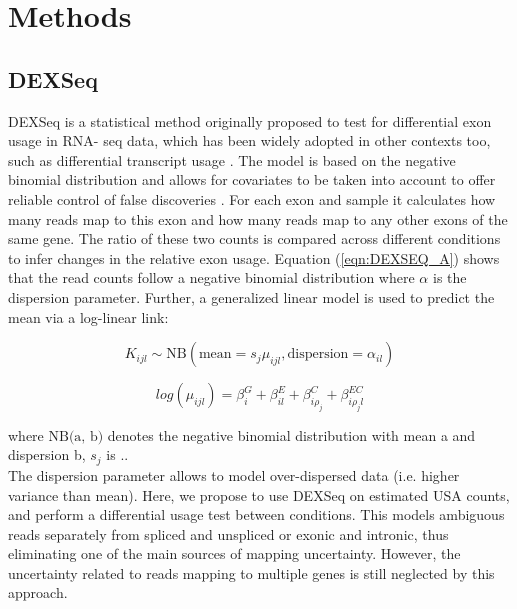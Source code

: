 

\chapter{Methods} 

\section{DEXSeq}
DEXSeq \citep{dexseq} is a statistical method originally proposed to test for differential exon usage in RNA- seq data, which has been widely adopted in other contexts too, such as differential transcript usage \citep{swimming_downstream}. The model is based on the negative binomial distribution and allows for covariates to be taken into account to offer reliable control of false discoveries \citep{dexseq}. For each exon and sample it calculates how many reads map to this exon and how many reads map to any other exons of the same gene. The ratio of these two counts is compared across different conditions to infer changes in the relative exon usage. Equation (\ref{eqn:DEXSEQ_A}) shows that the read counts follow a negative binomial distribution where $\alpha$ is the dispersion parameter. Further, a generalized linear model is used to predict the mean via a log-linear link:

\begin{equation}
K_{ijl} \sim \text{NB}(\text{mean}=s_j \mu_{ijl}, \text{dispersion}=\alpha_{il})
\label{eqn:DEXSEQ_A}
\end{equation}

\begin{equation}
log(\mu_{ijl}) = \beta^G_i + \beta^E_{il} + \beta_{i \rho_j}^C + \beta^{EC}_{i \rho_j l}
\label{eqn:DEXSEQ_B}
\end{equation}

where $\text{NB(a, b)}$ denotes the negative binomial distribution with mean a and dispersion b, $s_j$ is .. \\

The dispersion parameter allows to model over-dispersed data (i.e. higher variance than mean). Here, we propose to use DEXSeq on estimated USA counts, and perform a differential usage test between conditions. This models ambiguous reads separately from spliced and unspliced or exonic and intronic, thus eliminating one of the main sources of mapping uncertainty. However, the uncertainty related to reads mapping to multiple genes is still neglected by this approach. 

